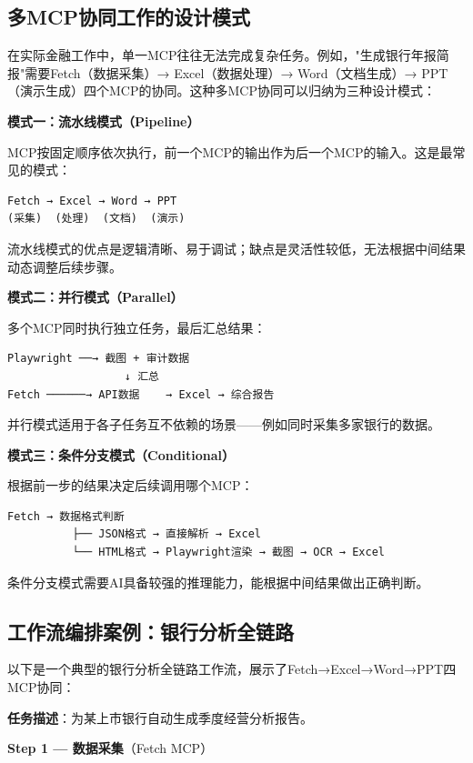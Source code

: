 \subsection{多MCP协同工作的设计模式}

在实际金融工作中，单一MCP往往无法完成复杂任务。例如，"生成银行年报简报"需要Fetch（数据采集）→ Excel（数据处理）→ Word（文档生成）→ PPT（演示生成）四个MCP的协同。这种多MCP协同可以归纳为三种设计模式：

\textbf{模式一：流水线模式（Pipeline）}

MCP按固定顺序依次执行，前一个MCP的输出作为后一个MCP的输入。这是最常见的模式：

\begin{verbatim}
Fetch → Excel → Word → PPT
(采集)  (处理)  (文档)  (演示)
\end{verbatim}

流水线模式的优点是逻辑清晰、易于调试；缺点是灵活性较低，无法根据中间结果动态调整后续步骤。

\textbf{模式二：并行模式（Parallel）}

多个MCP同时执行独立任务，最后汇总结果：

\begin{verbatim}
Playwright ──→ 截图 + 审计数据
                  ↓ 汇总
Fetch ──────→ API数据    → Excel → 综合报告
\end{verbatim}

并行模式适用于各子任务互不依赖的场景——例如同时采集多家银行的数据。

\textbf{模式三：条件分支模式（Conditional）}

根据前一步的结果决定后续调用哪个MCP：

\begin{verbatim}
Fetch → 数据格式判断
          ├── JSON格式 → 直接解析 → Excel
          └── HTML格式 → Playwright渲染 → 截图 → OCR → Excel
\end{verbatim}

条件分支模式需要AI具备较强的推理能力，能根据中间结果做出正确判断。

\subsection{工作流编排案例：银行分析全链路}

以下是一个典型的银行分析全链路工作流，展示了Fetch→Excel→Word→PPT四MCP协同：

\textbf{任务描述}：为某上市银行自动生成季度经营分析报告。

\textbf{Step 1 — 数据采集}（Fetch MCP）

